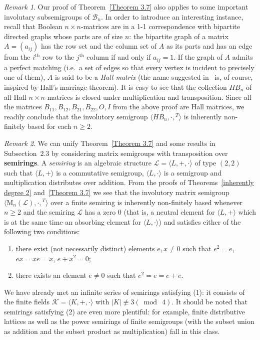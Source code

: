 \documentclass[11pt,reqno]{amsart}
\numberwithin{equation}{section}
\theoremstyle{remark}
\newtheorem{Rmk}{Remark}[section]
\def\cal{\mathcal}
\def\Bc{{\cal B}}
\begin{document}
\begin{Rmk}
Our proof of Theorem~\ref{Theorem 3.7} also applies to some
important involutary subsemigroups of $\Bc_n$. In order to
introduce an interesting instance, recall that Boolean
$n\times n$-matrices are in a 1-1 correspondence with
bipartite directed graphs whose parts are of size $n$:
the bipartite graph of a matrix $A=(a_{ij})$ has the row
set and the column set of $A$ as its parts and has an edge
from the $i^\mathrm{th}$ row to the $j^\mathrm{th}$ column
if and only if $a_{ij}=1$. If the graph of $A$ admits
a perfect matching (i.e.\ a set of edges so that every
vertex is incident to precisely one of them), $A$ is said
to be a \emph{Hall matrix} (the name suggested in~\cite{Kim}
is, of course, inspired by Hall's marriage theorem). It
is easy to see that the collection $HB_n$ of all Hall
$n\times n$-matrices is closed under multiplication and
transposition. Since all the matrices $B_{11}, B_{12}, B_{21},
B_{22},O,I$ from the above proof are Hall matrices, we readily
conclude that the involutory semigroup $\langle HB_n,\cdot,{}^T\rangle$
is inherently non-finitely based for each $n\ge 2$.
\end{Rmk}

\begin{Rmk}
We can unify Theorem~\ref{Theorem 3.7} and some results in
Subsection~2.3 by considering matrix semigroups with transposition
over \textbf{semirings}. A \emph{semiring} is an algebraic
structure $\mathcal{L}=\langle L,+,\cdot\rangle$ of type $(2,2)$
such that $\langle L,+\rangle$ is a commutative semigroup,
$\langle L,\cdot\rangle$ is a semigroup and multiplication
distributes over addition. From the proofs of
Theorems~\ref{inherently degree 2} and~\ref{Theorem 3.7} we see
that the involutory matrix semigroup
$\langle\mathrm{M}_n(\mathcal{L}),\cdot,{}^T\rangle$ over a finite
semiring is inherently non-finitely based whenever $n\ge 2$ and
the semiring $\mathcal{L}$ has a zero 0 (that is, a neutral
element for $\langle L,+\rangle$ which is at the same time an
absorbing element for $\langle L,\cdot\rangle$) and satisfies
either of the following two conditions:
\begin{enumerate}
\item there exist (not necessarily distinct) elements $e,x\ne 0$
such that $e^2=e$, $ex=xe=x$, $e+x^2=0$;
\item there exists an element $e\ne 0$ such that $e^2=e=e+e$.
\end{enumerate}
We have already met an infinite series of semirings satisfying
(1): it consists of the finite fields $\mathcal{K}=\langle
K,+,\cdot\rangle$ with $\vert K\vert\mathrel{\not\equiv 3}(\bmod\
4)$. It should be noted that semirings satisfying (2) are even
more plentiful: for example, finite distributive lattices as well
as the power semirings of finite semigroups (with the subset union
as addition and the subset product as multiplication) fall in this
class.
\end{Rmk}
\end{document}
